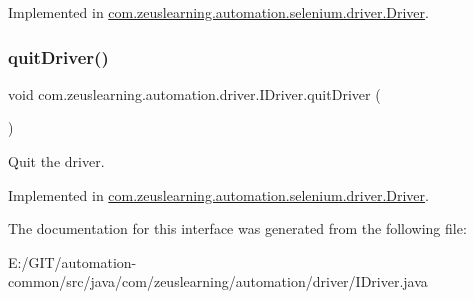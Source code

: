 Implemented in \hyperlink{classcom_1_1zeuslearning_1_1automation_1_1selenium_1_1driver_1_1Driver_a5e4cf6f7ea41db7d15f35aaa1052bd0f}{com.\+zeuslearning.\+automation.\+selenium.\+driver.\+Driver}.

\hypertarget{interfacecom_1_1zeuslearning_1_1automation_1_1driver_1_1IDriver_abf28b69bbf3db2e4f4727c3498ccde0f}{}\label{interfacecom_1_1zeuslearning_1_1automation_1_1driver_1_1IDriver_abf28b69bbf3db2e4f4727c3498ccde0f} 
\subsubsection{\texorpdfstring{quit\+Driver()}{quitDriver()}}
{\footnotesize\ttfamily void com.\+zeuslearning.\+automation.\+driver.\+I\+Driver.\+quit\+Driver (\begin{DoxyParamCaption}{ }\end{DoxyParamCaption})}

Quit the driver. 

Implemented in \hyperlink{classcom_1_1zeuslearning_1_1automation_1_1selenium_1_1driver_1_1Driver_aa185026e032362e2cbfa14b583cf7d48}{com.\+zeuslearning.\+automation.\+selenium.\+driver.\+Driver}.



The documentation for this interface was generated from the following file\+:\begin{DoxyCompactItemize}
\item 
E\+:/\+G\+I\+T/automation-\/common/src/java/com/zeuslearning/automation/driver/I\+Driver.\+java\end{DoxyCompactItemize}
